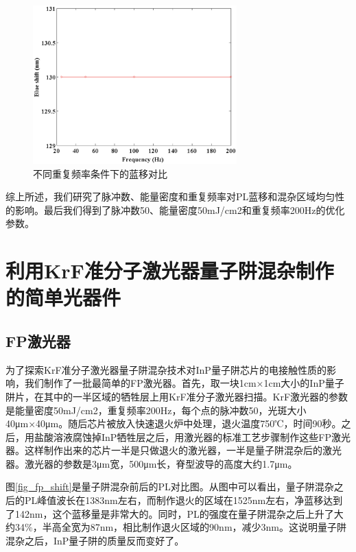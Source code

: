 \documentclass{ZJUthesis}
\begin{document}
\begin{figure}[!t]
    \centering
    \includegraphics[width=0.7\textwidth]{./Pictures/qwi_rr.eps}
    \caption{不同重复频率条件下的蓝移对比}
    \label{fig_qwi_rr}
\end{figure}

综上所述，我们研究了脉冲数、能量密度和重复频率对PL蓝移和混杂区域均匀性的影响。最后我们得到了脉冲数50、能量密度50mJ/cm2和重复频率200Hz的优化参数。

\section{利用KrF准分子激光器量子阱混杂制作的简单光器件}

\subsection{FP激光器}

为了探索KrF准分子激光器量子阱混杂技术对InP量子阱芯片的电接触性质的影响，我们制作了一批最简单的FP激光器。首先，取一块1cm×1cm大小的InP量子阱片，在其中的一半区域的牺牲层上用KrF准分子激光器扫描。KrF激光器的参数是能量密度50mJ/cm2，重复频率200Hz，每个点的脉冲数50，光斑大小40μm×40μm。随后芯片被放入快速退火炉中处理，退火温度750℃，时间90秒。之后，用盐酸溶液腐蚀掉InP牺牲层之后，用激光器的标准工艺步骤制作这些FP激光器。这样制作出来的芯片一半是只做退火的激光器，一半是量子阱混杂后的激光器。激光器的参数是3μm宽，500μm长，脊型波导的高度大约1.7μm。

图\ref{fig_fp_shift}是量子阱混杂前后的PL对比图。从图中可以看出，量子阱混杂之后的PL峰值波长在1383nm左右，而制作退火的区域在1525nm左右，净蓝移达到了142nm，这个蓝移量是非常大的。同时，PL的强度在量子阱混杂之后上升了大约34\%，半高全宽为87nm，相比制作退火区域的90nm，减少3nm。这说明量子阱混杂之后，InP量子阱的质量反而变好了。
\end{document}
